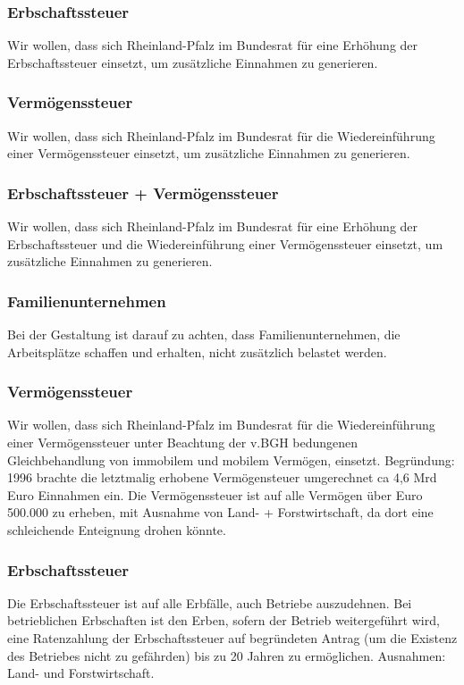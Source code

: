 \subsubsection{Erbschaftssteuer}
\abstimmung
Wir wollen, dass sich Rheinland-Pfalz im Bundesrat für eine Erhöhung der Erbschaftssteuer einsetzt, um zusätzliche Einnahmen zu generieren.

\subsubsection{Vermögenssteuer}
\abstimmung
Wir wollen, dass sich Rheinland-Pfalz im Bundesrat für die Wiedereinführung einer Vermögenssteuer einsetzt, um zusätzliche Einnahmen zu generieren.

\subsubsection{Erbschaftssteuer + Vermögenssteuer}
\abstimmung
Wir wollen, dass sich Rheinland-Pfalz im Bundesrat für eine Erhöhung der Erbschaftssteuer und die Wiedereinführung einer Vermögenssteuer einsetzt, um zusätzliche Einnahmen zu generieren.

\subsubsection{Familienunternehmen}
\abstimmung
Bei der Gestaltung ist darauf zu achten, dass Familienunternehmen, die Arbeitsplätze schaffen und erhalten, nicht zusätzlich belastet werden.
 
\label{wp:finanzen:einnahme2}

\subsubsection{Vermögenssteuer}
\abstimmung
Wir wollen, dass sich Rheinland-Pfalz im Bundesrat für die Wiedereinführung einer Vermögenssteuer unter Beachtung der v.BGH bedungenen Gleichbehandlung von immobilem und mobilem Vermögen, einsetzt. Begründung: 1996 brachte die letztmalig erhobene Vermögensteuer umgerechnet ca 4,6 Mrd Euro Einnahmen ein. Die Vermögenssteuer ist auf alle Vermögen über Euro 500.000 zu erheben, mit Ausnahme von Land- + Forstwirtschaft, da dort eine schleichende Enteignung drohen könnte.

\subsubsection{Erbschaftssteuer}
\abstimmung
Die Erbschaftssteuer ist auf alle Erbfälle, auch Betriebe auszudehnen. Bei betrieblichen Erbschaften ist den Erben, sofern der Betrieb weitergeführt wird, eine Ratenzahlung der Erbschaftssteuer auf begründeten Antrag (um die Existenz des Betriebes nicht zu gefährden) bis zu 20 Jahren zu ermöglichen. Ausnahmen: Land- und Forstwirtschaft.

